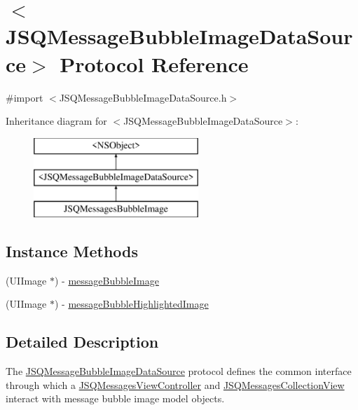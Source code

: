 \hypertarget{protocol_j_s_q_message_bubble_image_data_source-p}{}\section{$<$J\+S\+Q\+Message\+Bubble\+Image\+Data\+Source$>$ Protocol Reference}
\label{protocol_j_s_q_message_bubble_image_data_source-p}


{\ttfamily \#import $<$J\+S\+Q\+Message\+Bubble\+Image\+Data\+Source.\+h$>$}

Inheritance diagram for $<$J\+S\+Q\+Message\+Bubble\+Image\+Data\+Source$>$\+:\begin{figure}[H]
\begin{center}
\leavevmode
\includegraphics[height=3.000000cm]{protocol_j_s_q_message_bubble_image_data_source-p}
\end{center}
\end{figure}
\subsection*{Instance Methods}
\begin{DoxyCompactItemize}
\item 
(U\+I\+Image $\ast$) -\/ \hyperlink{protocol_j_s_q_message_bubble_image_data_source-p_a73145db7929a8b4311d614153187d4c1}{message\+Bubble\+Image}
\item 
(U\+I\+Image $\ast$) -\/ \hyperlink{protocol_j_s_q_message_bubble_image_data_source-p_a2bb25017c879f47bc5421b8f6da1a377}{message\+Bubble\+Highlighted\+Image}
\end{DoxyCompactItemize}


\subsection{Detailed Description}
The {\ttfamily \hyperlink{protocol_j_s_q_message_bubble_image_data_source-p}{J\+S\+Q\+Message\+Bubble\+Image\+Data\+Source}} protocol defines the common interface through which a {\ttfamily \hyperlink{interface_j_s_q_messages_view_controller}{J\+S\+Q\+Messages\+View\+Controller}} and {\ttfamily \hyperlink{interface_j_s_q_messages_collection_view}{J\+S\+Q\+Messages\+Collection\+View}} interact with message bubble image model objects.

